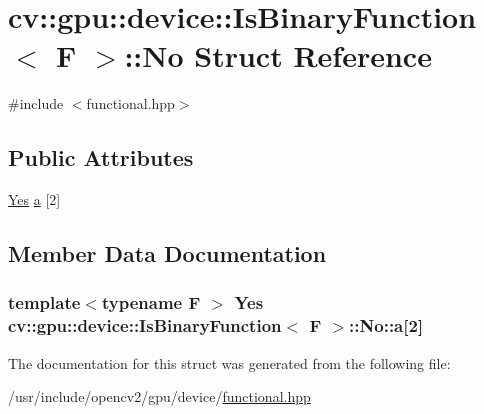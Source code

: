 \hypertarget{structcv_1_1gpu_1_1device_1_1IsBinaryFunction_1_1No}{\section{cv\-:\-:gpu\-:\-:device\-:\-:Is\-Binary\-Function$<$ F $>$\-:\-:No Struct Reference}
\label{structcv_1_1gpu_1_1device_1_1IsBinaryFunction_1_1No}
}


{\ttfamily \#include $<$functional.\-hpp$>$}

\subsection*{Public Attributes}
\begin{DoxyCompactItemize}
\item 
\hyperlink{structcv_1_1gpu_1_1device_1_1IsBinaryFunction_a791b19dc5bfef876ebe0f3b2c966f597}{Yes} \hyperlink{structcv_1_1gpu_1_1device_1_1IsBinaryFunction_1_1No_a5d8ab3e53e2c9b6d32fef08786a48849}{a} \mbox{[}2\mbox{]}
\end{DoxyCompactItemize}


\subsection{Member Data Documentation}
\hypertarget{structcv_1_1gpu_1_1device_1_1IsBinaryFunction_1_1No_a5d8ab3e53e2c9b6d32fef08786a48849}{
\subsubsection[{a}]{\setlength{\rightskip}{0pt plus 5cm}template$<$typename F $>$ {\bf Yes} {\bf cv\-::gpu\-::device\-::\-Is\-Binary\-Function}$<$ {\bf F} $>$\-::No\-::a\mbox{[}2\mbox{]}}}\label{structcv_1_1gpu_1_1device_1_1IsBinaryFunction_1_1No_a5d8ab3e53e2c9b6d32fef08786a48849}


The documentation for this struct was generated from the following file\-:\begin{DoxyCompactItemize}
\item 
/usr/include/opencv2/gpu/device/\hyperlink{functional_8hpp}{functional.\-hpp}\end{DoxyCompactItemize}
